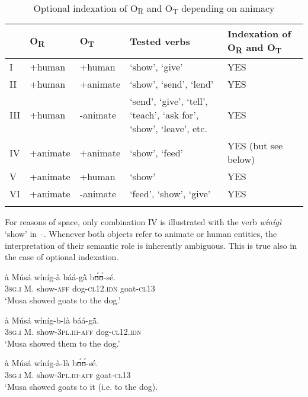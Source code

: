 \documentclass[output=paper]{langsci/langscibook}
\begin{document}
\begin{table}
\begin{tabularx}{\textwidth}{lll>{\raggedright\arraybackslash}Xl} 
\lsptoprule & {O}{\textsubscript{R}} & {O}{\textsubscript{T}} & {Tested verbs} & {Indexation of O}{\textsubscript{R}}{ and O}{\textsubscript{T}}{} \\
\midrule
I & +human & +human & `show', `give' & YES\\
II & +human & +animate & `show', `send', `lend' & YES\\
III & +human & -animate & `send', `give', `tell', `teach', `ask for', `show', `leave', etc. & YES\\
IV & +animate & +animate & `show', `feed' & YES (but see below)\\
V & +animate & +human & `show' & YES\\
VI & +animate & -animate & `feed', `show', `give' & YES\\
\lspbottomrule
\end{tabularx}
\caption{Optional indexation of O{\textsubscript{R}} and O{\textsubscript{T}} depending on animacy}
\label{tab:3.pacchiarotti}

 \end{table}


For reasons of space, only combination IV is illustrated with the verb \textit{wínígì} `show' in --. Whenever both objects refer to animate or human entities, the interpretation of their semantic role is inherently ambiguous. This is true also in the case of optional indexation.

\ea
\label{ex:25.pacchiarotti}
\gll à    Músá  wíníg-à  báá-g\`{ã}    bʊ́ʊ́-sé. \\
\textsc{3sg.i}    M.  show-\textsc{aff}  dog-\textsc{cl12.idn}  goat-\textsc{cl13}\\
\glt `Musa showed goats to the dog.'
\z

\ea
\label{ex:26.pacchiarotti}
\gll à    Músá  wíníg-b-là    báá-g\`{ã}.\\
\textsc{3sg.i} M.  show-\textsc{3pl.iii-aff}  dog-\textsc{cl12.idn}\\
\glt `Musa showed them to the dog.'  
\z

\ea
\label{ex:27.pacchiarotti}
\gll à    Músá  wíníg-à-là    bʊ́ʊ́-sé.\\
\textsc{3sg.i}    M.  show-\textsc{3pl.iii-aff}  goat-\textsc{cl13}\\
\glt `Musa showed goats to it (i.e. to the dog).
\z
\end{document}
